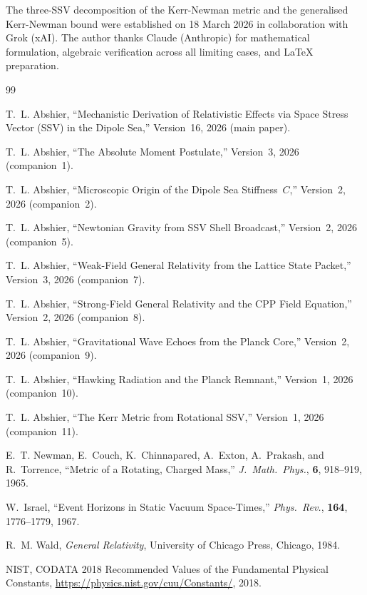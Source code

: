 \documentclass[12pt]{article}
\begin{document}
The three-SSV decomposition of the Kerr-Newman metric and the
generalised Kerr-Newman bound were established on 18 March 2026
in collaboration with Grok (xAI).  The author thanks Claude (Anthropic)
for mathematical formulation, algebraic verification across all
limiting cases, and LaTeX preparation.

\begin{thebibliography}{99}

T.~L. Abshier,
``Mechanistic Derivation of Relativistic Effects via Space Stress
Vector (SSV) in the Dipole Sea,''
Version~16, 2026 (main paper).

T.~L. Abshier,
``The Absolute Moment Postulate,''
Version~3, 2026 (companion~1).

T.~L. Abshier,
``Microscopic Origin of the Dipole Sea Stiffness~$C$,''
Version~2, 2026 (companion~2).

T.~L. Abshier,
``Newtonian Gravity from SSV Shell Broadcast,''
Version~2, 2026 (companion~5).

T.~L. Abshier,
``Weak-Field General Relativity from the Lattice State Packet,''
Version~3, 2026 (companion~7).

T.~L. Abshier,
``Strong-Field General Relativity and the CPP Field Equation,''
Version~2, 2026 (companion~8).

T.~L. Abshier,
``Gravitational Wave Echoes from the Planck Core,''
Version~2, 2026 (companion~9).

T.~L. Abshier,
``Hawking Radiation and the Planck Remnant,''
Version~1, 2026 (companion~10).

T.~L. Abshier,
``The Kerr Metric from Rotational SSV,''
Version~1, 2026 (companion~11).

E.~T. Newman, E.~Couch, K.~Chinnapared, A.~Exton, A.~Prakash,
and R.~Torrence,
``Metric of a Rotating, Charged Mass,''
\textit{J.\ Math.\ Phys.}, \textbf{6}, 918--919, 1965.

W.~Israel,
``Event Horizons in Static Vacuum Space-Times,''
\textit{Phys.\ Rev.}, \textbf{164}, 1776--1779, 1967.

R.~M. Wald,
\textit{General Relativity},
University of Chicago Press, Chicago, 1984.

NIST, CODATA 2018 Recommended Values of the Fundamental Physical
Constants, \url{https://physics.nist.gov/cuu/Constants/}, 2018.

\end{thebibliography}
\end{document}

